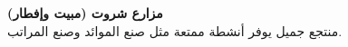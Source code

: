 {\textbf{مزارع شروت (مبيت وإفطار)}}\\
منتجع جميل يوفر أنشطة ممتعة مثل صنع الموائد وصنع المراتب.\\
\vspace*{2mm}
